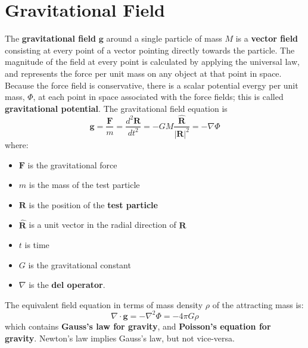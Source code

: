 \section{Gravitational Field}
The \textbf{gravitational field} $\mathbf{g}$ around a single particle of mass $M$ is a \textbf{vector field} consisting at every point of a vector pointing directly towards the particle. The magnitude of the field at every point is calculated by applying the universal law, and represents the force per unit mass on any object at that point in space. Because the force field is conservative, there is a scalar potential evergy per unit mass, $\Phi$, at each point in space associated with the force fields; this is called \textbf{gravitational potential}. The gravitational field equation is
\[
\mathbf{g} = \frac{\mathbf{F}}{m} = \frac{d^2\mathbf{R}}{dt^2} = -GM\frac{\hat{\mathbf{R}}}{|\mathbf{R}|^2} = -\nabla\Phi
\]
where:
\begin{itemize}
	\item $\mathbf{F}$ is the gravitational force
	\item $m$ is the mass of the test particle
	\item $\mathbf{R}$ is the position of the \textbf{test particle}
	\item $\hat{\mathbf{R}}$ is a unit vector in the radial direction of $\mathbf{R}$
	\item $t$ is time
	\item $G$ is the gravitational constant
	\item $\nabla$ is the \textbf{del operator}.
\end{itemize}
The equivalent field equation in terms of mass density $\rho$ of the attracting mass is:
\[
\nabla \cdot \mathbf {g} =-\nabla ^{2}\Phi =-4\pi G\rho
\]
which contains \textbf{Gauss's law for gravity}, and \textbf{Poisson's equation for gravity}. Newton's law implies Gauss's law, but not vice-versa.